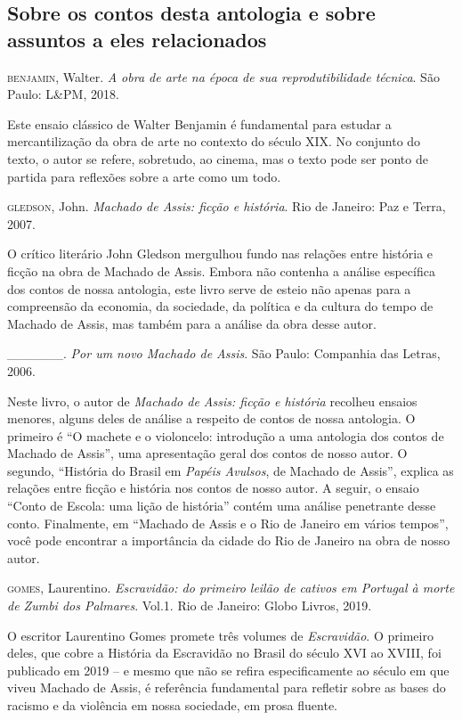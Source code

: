 \documentclass[11pt]{extarticle}
\begin{document}
\subsection{Sobre os contos desta antologia e sobre assuntos a eles relacionados}

\textsc{benjamin}, Walter. \textit{A obra de arte na época de sua
reprodutibilidade técnica}. São Paulo: L\&PM, 2018.

Este ensaio clássico de Walter Benjamin é fundamental para estudar a
mercantilização da obra de arte no contexto do século XIX. No conjunto
do texto, o autor se refere, sobretudo, ao cinema, mas o texto pode ser
ponto de partida para reflexões sobre a arte como um todo.

\textsc{gledson}, John. \textit{Machado de Assis: ficção e história}. Rio de
Janeiro: Paz e Terra, 2007.

O crítico literário John Gledson mergulhou fundo nas relações entre
história e ficção na obra de Machado de Assis. Embora não contenha a
análise específica dos contos de nossa antologia, este livro serve de
esteio não apenas para a compreensão da economia, da sociedade, da
política e da cultura do tempo de Machado de Assis, mas também para a
análise da obra desse autor.

\_\_\_\_\_\_. \textit{Por um novo Machado de Assis}. São Paulo:
Companhia das Letras, 2006.

Neste livro, o autor de \emph{Machado de Assis: ficção e história}
recolheu ensaios menores, alguns deles de análise a respeito de contos
de nossa antologia. O primeiro é ``O machete e o violoncelo: introdução
a uma antologia dos contos de Machado de Assis'', uma apresentação geral
dos contos de nosso autor. O segundo, ``História do Brasil em
\emph{Papéis Avulsos}, de Machado de Assis'', explica as relações entre
ficção e história nos contos de nosso autor. A seguir, o ensaio ``Conto
de Escola: uma lição de história'' contém uma análise penetrante desse
conto. Finalmente, em ``Machado de Assis e o Rio de Janeiro em vários
tempos'', você pode encontrar a importância da cidade do Rio de Janeiro
na obra de nosso autor.

\textsc{gomes}, Laurentino. \textit{Escravidão: do primeiro leilão de cativos em
Portugal à morte de Zumbi dos Palmares}. Vol.1. Rio de Janeiro: Globo
Livros, 2019.

O escritor Laurentino Gomes promete três volumes de \emph{Escravidão}. O
primeiro deles, que cobre a História da Escravidão no Brasil do século
XVI ao XVIII, foi publicado em 2019 -- e mesmo que não se refira
especificamente ao século em que viveu Machado de Assis, é referência
fundamental para refletir sobre as bases do racismo e da violência em
nossa sociedade, em prosa fluente.
\end{document}
